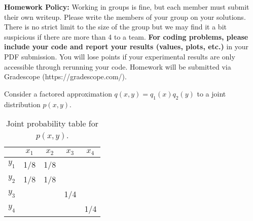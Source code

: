 \documentclass{abernethy_hw}
\begin{document}
\maketitle
\textbf{Homework Policy:} Working in groups is fine, but each member must submit their own writeup. Please write the members of your group on your solutions. There is no strict limit to the size of the group but we may find it a bit suspicious if there are more than 4 to a team. \textbf{For coding problems, please include your code and report your results (values, plots, etc.)} in your PDF submission. You will lose points if your experimental results are only accessible through rerunning your code. Homework will be submitted via Gradescope (https://gradescope.com/).
\vspace{1em}


Consider a factored approximation $q(x,y) = q_1(x)q_2(y)$ to a joint distribution $p(x,y)$.



\begin{table}[h]
    \centering
    \begin{tabular}{c|cccc}
        & $x_1$ & $x_2$ & $x_3$ & $x_4$ \\ \hline
    $y_1$ & 1/8 & 1/8 &     &     \\
    $y_2$ & 1/8 & 1/8 &     &     \\
    $y_3$ &     &     & 1/4 &     \\
    $y_4$ &     &     &     & 1/4
    \end{tabular}
    \caption{Joint probability table for $p(x,y)$.}
\end{table}


\end{document}
